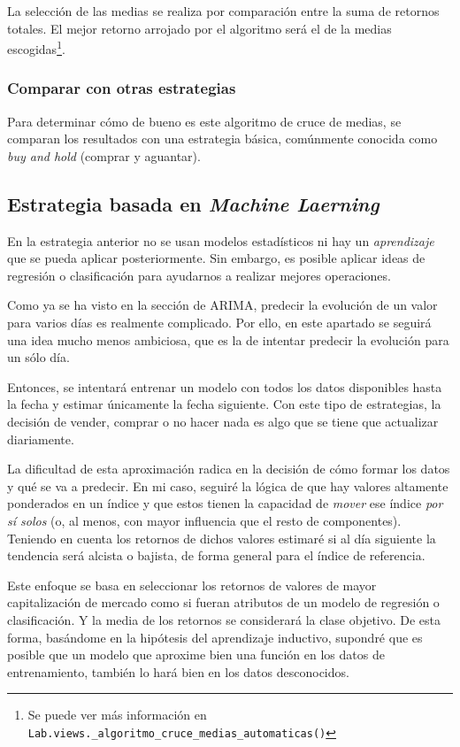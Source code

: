 La selección de las medias se realiza por comparación entre la suma de retornos totales. El mejor retorno arrojado por el algoritmo será el de la medias escogidas\footnote{Se puede ver más información en \texttt{Lab.views.\_algoritmo\_cruce\_medias\_automaticas()}}. 


\subsubsection{Comparar con otras estrategias}

Para determinar cómo de bueno es este algoritmo de cruce de medias, se comparan los resultados con una estrategia básica, comúnmente conocida como \emph{buy and hold} (comprar y aguantar)\citep{wiki:buy_and_hold}.


\subsection{Estrategia basada en \emph{Machine Laerning}}

En la estrategia anterior no se usan modelos estadísticos ni hay un \emph{aprendizaje} que se pueda aplicar posteriormente. Sin embargo, es posible aplicar ideas de regresión o clasificación para ayudarnos a realizar mejores operaciones. 

Como ya se ha visto en la sección de ARIMA, predecir la evolución de un valor para varios días es realmente complicado. Por ello, en este apartado se seguirá una idea mucho menos ambiciosa, que es la de intentar predecir la evolución para un sólo día. 

Entonces, se intentará entrenar un modelo con todos los datos disponibles hasta la fecha y estimar únicamente la fecha siguiente. Con este tipo de estrategias, la decisión de vender, comprar o no hacer nada es algo que se tiene que actualizar diariamente. 

La dificultad de esta aproximación radica en la decisión de cómo formar los datos y qué se va a predecir. En mi caso, seguiré la lógica de que hay valores altamente ponderados en un índice y que estos tienen la capacidad de \emph{mover} ese índice \emph{por sí solos} (o, al menos, con mayor influencia que el resto de componentes). Teniendo en cuenta los retornos de dichos valores estimaré si al día siguiente la tendencia será alcista o bajista, de forma general para el índice de referencia. 

Este enfoque se basa en seleccionar los retornos de valores de mayor capitalización de mercado \citep{wiki:market_cap} como si fueran atributos de un modelo de regresión o clasificación. Y la media de los retornos se considerará la clase objetivo. De esta forma, basándome en la hipótesis del aprendizaje inductivo, supondré que es posible que un modelo que aproxime bien una función en los datos de entrenamiento, también lo hará bien en los datos desconocidos. 

